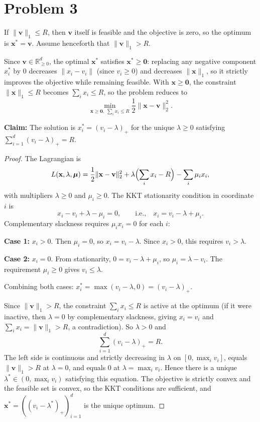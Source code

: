 \section*{Problem 3}

If $\|\mathbf{v}\|_1 \leq R$, then $\mathbf{v}$ itself is feasible and the objective is zero, so the optimum is $\mathbf{x}^* = \mathbf{v}$. Assume henceforth that $\|\mathbf{v}\|_1 > R$.

Since $\mathbf{v} \in \mathbb{R}^d_{\geq 0}$, the optimal $\mathbf{x}^*$ satisfies $\mathbf{x}^* \geq \mathbf{0}$: replacing any negative component $x_i^*$ by $0$ decreases $\|x_i - v_i\|$ (since $v_i \geq 0$) and decreases $\|\mathbf{x}\|_1$, so it strictly improves the objective while remaining feasible. With $\mathbf{x} \geq \mathbf{0}$, the constraint $\|\mathbf{x}\|_1 \leq R$ becomes $\sum_i x_i \leq R$, so the problem reduces to
\[
\min_{\mathbf{x} \geq \mathbf{0},\; \sum_i x_i \leq R} \frac{1}{2}\|\mathbf{x} - \mathbf{v}\|_2^2.
\]

\textbf{Claim:} The solution is $x_i^* = (v_i - \lambda)_+$ for the unique $\lambda \geq 0$ satisfying $\sum_{i=1}^d (v_i - \lambda)_+ = R$.

\begin{proof}
The Lagrangian is
\[
L(\mathbf{x}, \lambda, \boldsymbol{\mu}) = \frac{1}{2}\|\mathbf{x} - \mathbf{v}\|_2^2 + \lambda\Bigl(\sum_i x_i - R\Bigr) - \sum_i \mu_i x_i,
\]
with multipliers $\lambda \geq 0$ and $\mu_i \geq 0$. The KKT stationarity condition in coordinate $i$ is
\[
x_i - v_i + \lambda - \mu_i = 0, \qquad \text{i.e.,} \quad x_i = v_i - \lambda + \mu_i.
\]
Complementary slackness requires $\mu_i x_i = 0$ for each $i$:

\textbf{Case 1:} $x_i > 0$. Then $\mu_i = 0$, so $x_i = v_i - \lambda$. Since $x_i > 0$, this requires $v_i > \lambda$.

\textbf{Case 2:} $x_i = 0$. From stationarity, $0 = v_i - \lambda + \mu_i$, so $\mu_i = \lambda - v_i$. The requirement $\mu_i \geq 0$ gives $v_i \leq \lambda$.

Combining both cases: $x_i^* = \max(v_i - \lambda, 0) = (v_i - \lambda)_+$.

Since $\|\mathbf{v}\|_1 > R$, the constraint $\sum_i x_i \leq R$ is active at the optimum (if it were inactive, then $\lambda = 0$ by complementary slackness, giving $x_i = v_i$ and $\sum_i x_i = \|\mathbf{v}\|_1 > R$, a contradiction). So $\lambda > 0$ and
\[
\sum_{i=1}^d (v_i - \lambda)_+ = R.
\]
The left side is continuous and strictly decreasing in $\lambda$ on $[0, \max_i v_i]$, equals $\|\mathbf{v}\|_1 > R$ at $\lambda = 0$, and equals $0$ at $\lambda = \max_i v_i$. Hence there is a unique $\lambda^* \in (0, \max_i v_i)$ satisfying this equation. The objective is strictly convex and the feasible set is convex, so the KKT conditions are sufficient, and $\mathbf{x}^* = ((v_i - \lambda^*)_+)_{i=1}^d$ is the unique optimum.
\end{proof}

